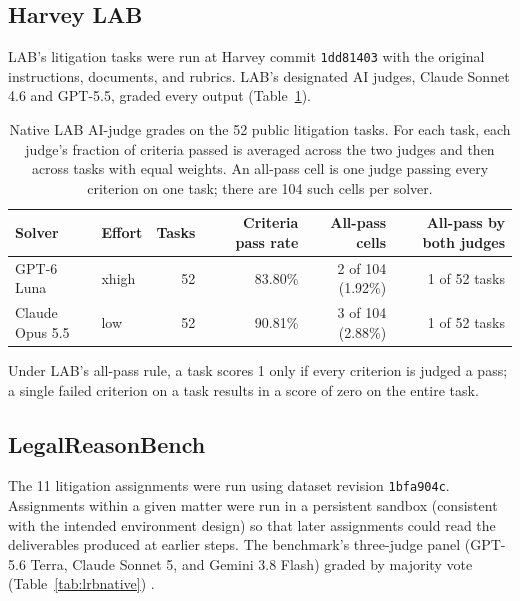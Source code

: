 \documentclass[11pt]{article}
\newcommand{\labTasks}{52}
\newcommand{\lrbAssignments}{11}
\newcommand{\labNativeLunaPassPct}{83.80}
\newcommand{\labNativeOpusPassPct}{90.81}
\newcommand{\labNativeCells}{104}
\newcommand{\labNativeLunaAllPass}{2}
\newcommand{\labNativeOpusAllPass}{3}
\newcommand{\labNativeLunaAllPassPct}{1.92}
\newcommand{\labNativeOpusAllPassPct}{2.88}
\begin{document}
\subsection*{Harvey LAB}
LAB's litigation tasks were run at Harvey commit \texttt{1dd81403} with the original instructions, documents, and rubrics. LAB's designated AI judges, Claude Sonnet 4.6 and GPT-5.5, graded every output (Table~\ref{tab:nativejudging}).

\begin{table}[ht]\centering\footnotesize
\begin{tabular}{llrrrr}\toprule
Solver & Effort & Tasks & Criteria pass rate & All-pass cells & All-pass by both judges\\\midrule
GPT-6 Luna & xhigh & \labTasks{} & \labNativeLunaPassPct\% & \labNativeLunaAllPass{} of \labNativeCells{} (\labNativeLunaAllPassPct\%) & 1 of \labTasks{} tasks\\
Claude Opus 5.5 & low & \labTasks{} & \labNativeOpusPassPct\% & \labNativeOpusAllPass{} of \labNativeCells{} (\labNativeOpusAllPassPct\%) & 1 of \labTasks{} tasks\\
\bottomrule\end{tabular}
\caption{Native LAB AI-judge grades on the \labTasks{} public litigation tasks. For each task, each judge's fraction of criteria passed is averaged across the two judges and then across tasks with equal weights. An all-pass cell is one judge passing every criterion on one task; there are \labNativeCells{} such cells per solver.}
\label{tab:nativejudging}\end{table}

Under LAB's all-pass rule, a task scores 1 only if every criterion is judged a pass; a single failed criterion on a task results in a score of zero on the entire task.

\subsection*{LegalReasonBench}
The \lrbAssignments{} litigation assignments were run using dataset revision \texttt{1bfa904c}. Assignments within a given matter were run in a persistent sandbox (consistent with the intended environment design) so that later assignments could read the deliverables produced at earlier steps. The benchmark's three-judge panel (GPT-5.6 Terra, Claude Sonnet 5, and Gemini 3.8 Flash) graded by majority vote (Table~\ref{tab:lrbnative}) \citep{lrbaudit}.
\end{document}
